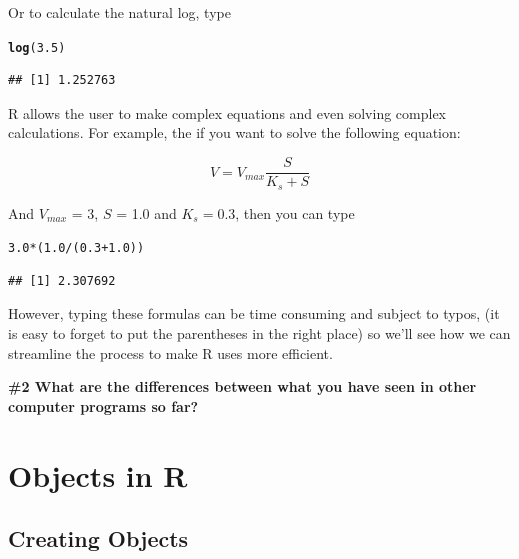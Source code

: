\documentclass{tufte-handout}\usepackage[]{graphicx}\usepackage[]{xcolor}
\makeatletter
\newcommand{\hlnum}[1]{\textcolor[rgb]{0.686,0.059,0.569}{#1}}%
\newcommand{\hlopt}[1]{\textcolor[rgb]{0,0,0}{#1}}%
\newcommand{\hlstd}[1]{\textcolor[rgb]{0.345,0.345,0.345}{#1}}%
\newcommand{\hlkwd}[1]{\textcolor[rgb]{0.737,0.353,0.396}{\textbf{#1}}}%
\newenvironment{kframe}{%
 \def\at@end@of@kframe{}%
 \ifinner\ifhmode%
  \def\at@end@of@kframe{\end{minipage}}%
  \begin{minipage}{\columnwidth}%
 \fi\fi%
 \def\FrameCommand##1{\hskip\@totalleftmargin \hskip-\fboxsep
 \colorbox{shadecolor}{##1}\hskip-\fboxsep
     \hskip-\linewidth \hskip-\@totalleftmargin \hskip\columnwidth}%
 \MakeFramed {\advance\hsize-\width
   \@totalleftmargin\z@ \linewidth\hsize
   \@setminipage}}%
 {\par\unskip\endMakeFramed%
 \at@end@of@kframe}
\newenvironment{knitrout}{}{} %
\makeatother
\begin{document}
Or to calculate the natural log, type
\begin{knitrout}
\color{fgcolor}\begin{kframe}
\begin{alltt}
\hlkwd{log}\hlstd{(}\hlnum{3.5}\hlstd{)}
\end{alltt}
\begin{verbatim}
## [1] 1.252763
\end{verbatim}
\end{kframe}
\end{knitrout}

R allows the user to make complex equations and even solving complex calculations. For example, the if you want to solve the following equation:

\begin{equation}
V = V_{max}\frac{S}{K_s + S}
\end{equation}

And $V_{max}$ = 3, $S$ = 1.0 and $K_s = 0.3$, then you can type

\begin{knitrout}
\color{fgcolor}\begin{kframe}
\begin{alltt}
\hlnum{3.0} \hlopt{*} \hlstd{(}\hlnum{1.0} \hlopt{/} \hlstd{(}\hlnum{0.3} \hlopt{+} \hlnum{1.0}\hlstd{))}
\end{alltt}
\begin{verbatim}
## [1] 2.307692
\end{verbatim}
\end{kframe}
\end{knitrout}

However, typing these formulas can be time consuming and subject to typos, (\eg it is easy to forget to put the parentheses in the right place) so we'll see how we can streamline the process to make R uses more efficient. 

\bigskip
\noindent \textbf{\#2 What are the differences between what you have seen in other computer programs so far? }

\section{Objects in R}

\subsection{Creating Objects}
\end{document}
